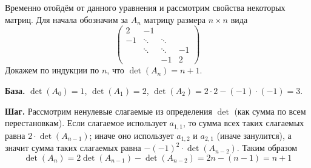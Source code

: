 \documentclass[12pt,a4paper]{article}
\begin{document}
\begin{enumproblem}
        Временно отойдём от данного уравнения и рассмотрим свойства некоторых матриц. Для начала обозначим за $A_n$ матрицу размера $n \times n$ вида
        \[
            \begin{pmatrix}
                2& -1\\
                -1& \ddots& \ddots\\
                & \ddots& \ddots& -1\\
                && -1& 2
            \end{pmatrix}
        \]
        Докажем по индукции по $n$, что $\det(A_n) = n+1$.

        \textbf{База.} $\det(A_0) = 1$, $\det(A_1) = 2$, $\det(A_2) = 2 \cdot 2 - (-1) \cdot (-1) = 3$.

        \textbf{Шаг.} Рассмотрим ненулевые слагаемые из определения $\det$ (как сумма по всем перестановкам). Если слагаемое использует $a_{1,1}$, то сумма всех таких слагаемых равна $2 \cdot \det(A_{n-1})$; иначе оно использует $a_{1, 2}$ и $a_{2, 1}$ (иначе занулится), а значит сумма таких слагаемых равна $- (-1)^2 \cdot \det(A_{n-2})$. Таким образом
        \[\det(A_n) = 2\det(A_{n-1}) - \det(A_{n-2}) = 2n - (n-1) = n+1\]


\end{enumproblem}
\end{document}
